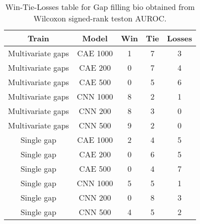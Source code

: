 \begin{table}[H]
\centering
\begin{tabular}{|c|c|c|c|c|}

    \textbf{Train} & \textbf{Model} &  \textbf{Win} &  \textbf{Tie} &  \textbf{Losses} \\
\hline

 Multivariate gaps &       CAE 1000 &             1 &             7 &                3 \\
\hline
 Multivariate gaps &        CAE 200 &             0 &             7 &                4 \\
\hline
 Multivariate gaps &        CAE 500 &             0 &             5 &                6 \\
\hline
 Multivariate gaps &       CNN 1000 &             8 &             2 &                1 \\
\hline
 Multivariate gaps &        CNN 200 &             8 &             3 &                0 \\
\hline
 Multivariate gaps &        CNN 500 &             9 &             2 &                0 \\
\hline
        Single gap &       CAE 1000 &             2 &             4 &                5 \\
\hline
        Single gap &        CAE 200 &             0 &             6 &                5 \\
\hline
        Single gap &        CAE 500 &             0 &             4 &                7 \\
\hline
        Single gap &       CNN 1000 &             5 &             5 &                1 \\
\hline
        Single gap &        CNN 200 &             0 &             8 &                3 \\
\hline
        Single gap &        CNN 500 &             4 &             5 &                2 \\
\hline

\end{tabular}
\caption{Win-Tie-Losses table for Gap filling bio obtained from Wilcoxon signed-rank teston AUROC.}
\label{tab:gap_filling_bio_model_training_data_comparison}
\end{table}